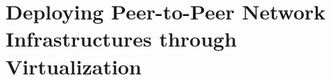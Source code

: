 
\chapter{Deploying Peer-to-Peer Network Infrastructures through
Virtualization}
\label{chapter:virt-infra}
